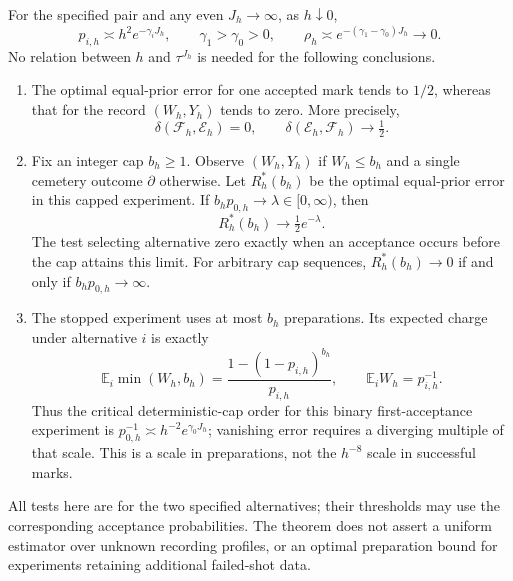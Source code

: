 \begin{theorem}
\label{thm:v54-waiting-and-cap}
For the specified pair and any even $J_h\to\infty$, as $h\downarrow0$,
\begin{equation}\label{eq:v54-escape-separation}
 p_{i,h}\asymp h^2e^{-\gamma_iJ_h},\qquad
 \gamma_1>\gamma_0>0,\qquad
 \rho_h\asymp e^{-(\gamma_1-\gamma_0)J_h}\longrightarrow0.
\end{equation}
No relation between $h$ and $\tau^{J_h}$ is needed for the following
conclusions.
\begin{enumerate}
\item The optimal equal-prior error for one accepted mark tends to
$1/2$, whereas that for the record $(W_h,Y_h)$ tends to zero.  More
precisely,
\begin{equation}\label{eq:v54-deficiency}
 \delta(\mathcal F_h,\mathcal E_h)=0,\qquad
 \delta(\mathcal E_h,\mathcal F_h)\longrightarrow\tfrac12.
\end{equation}
\item Fix an integer cap $b_h\ge1$.  Observe $(W_h,Y_h)$ if $W_h\le b_h$
and a single cemetery outcome $\partial$ otherwise.  Let $R_h^*(b_h)$
be the optimal equal-prior error in this capped experiment.  If
$b_hp_{0,h}\to\lambda\in[0,\infty)$, then
\begin{equation}\label{eq:v54-capped-critical-risk}
                       R_h^*(b_h)\longrightarrow\tfrac12e^{-\lambda}.
\end{equation}
The test selecting alternative zero exactly when an acceptance occurs
before the cap attains this limit.  For arbitrary cap sequences,
$R_h^*(b_h)\to0$ if and only if $b_hp_{0,h}\to\infty$.
\item The stopped experiment uses at most $b_h$ preparations.  Its
expected charge under alternative $i$ is exactly
\begin{equation}\label{eq:v54-capped-charge}
 \mathbb E_i\min(W_h,b_h)=\frac{1-(1-p_{i,h})^{b_h}}{p_{i,h}},
                \qquad \mathbb E_iW_h=p_{i,h}^{-1}.
\end{equation}
Thus the critical deterministic-cap order for this binary
first-acceptance experiment is
$p_{0,h}^{-1}\asymp h^{-2}e^{\gamma_0J_h}$; vanishing error requires
a diverging multiple of that scale.  This is a scale in preparations,
not the $h^{-8}$ scale in successful marks.
\end{enumerate}
All tests here are for the two specified alternatives; their thresholds
may use the corresponding acceptance probabilities.  The theorem does not
assert a uniform estimator over unknown recording profiles, or an optimal
preparation bound for experiments retaining additional failed-shot data.
\end{theorem}

